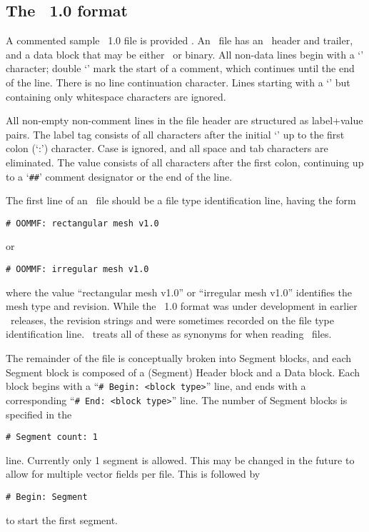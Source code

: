 \setcounter{secnumdepth}{\value{ffoldsecnumdepth}}

\subsection{The \OVF\ 1.0 format}\label{sec:ovfformat}
A commented sample \OVF\ 1.0 file is provided
.
An \OVF\ file has an \ASCII\ header and trailer, and a data block that
may be either \ASCII\ or binary.  All non-data lines begin with a `\lb'
character; double `\lb\lb' mark the start of a comment, which
continues until the end of the line.  There is no line continuation
character.  Lines starting with a `\lb' but containing only whitespace
characters are ignored.

All non-empty non-comment lines in the file header are structured as
label+value pairs.  The label tag consists of all characters after the
initial `\lb' up to the first colon (`:') character.  Case is ignored,
and all space and tab characters are eliminated.  The value consists
of all characters after the first colon, continuing up to a `\verb+##+'
comment designator or the end of the line.

The first line of an \OVF\ file should be a file type identification
line, having the form
\begin{verbatim}
# OOMMF: rectangular mesh v1.0
\end{verbatim}
or
\begin{verbatim}
# OOMMF: irregular mesh v1.0
\end{verbatim}
where the value ``rectangular mesh v1.0'' or ``irregular mesh v1.0''
identifies the mesh type and revision.  While the \OVF\ 1.0 format was
under development in earlier \OOMMF\ releases, the revision strings
 and  were sometimes recorded on the file type
identification line. \OOMMF\ treats all of these as synonyms for
 when reading \OVF\ files.

The remainder of the file is conceptually broken into Segment
blocks, and each Segment block is composed of a
(Segment) Header block and a Data block.  Each block begins with a
``\verb+# Begin: <block type>+'' line, and ends with a corresponding
``\verb+# End: <block type>+'' line.  The number of Segment blocks is
specified in the
\begin{verbatim}
# Segment count: 1
\end{verbatim}
line.  Currently only 1 segment is allowed.  This may be changed in
the future to allow for multiple vector fields per file.  
This is followed by
\begin{verbatim}
# Begin: Segment
\end{verbatim}
to start the first segment.

